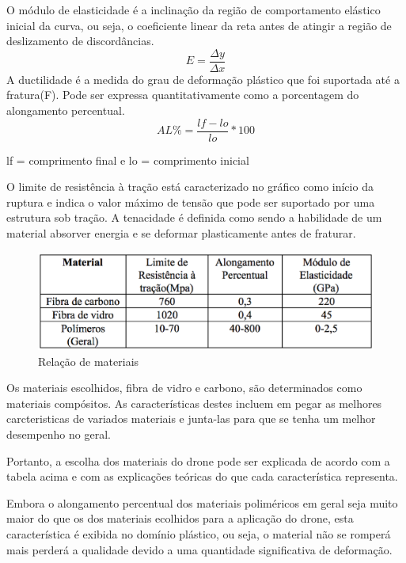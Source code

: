 O módulo de elasticidade é a inclinação da região de comportamento elástico inicial da curva, ou seja, o coeficiente linear da reta antes de atingir a região de deslizamento de discordâncias.
\begin{equation}
E =\frac{\Delta y}{\Delta x}
\end{equation}
A ductilidade é a medida do grau de deformação plástico que foi suportada até a fratura(F). Pode ser expressa quantitativamente como a porcentagem do alongamento percentual.
\begin{equation}
AL\% =\frac{lf - lo}{lo} * 100
\end{equation}
\begin{center}
lf = comprimento final e lo = comprimento inicial
\end{center}

O limite de resistência à tração está caracterizado no gráfico como início da ruptura e indica o valor máximo de tensão que pode ser suportado por uma estrutura sob tração.
A tenacidade é definida como sendo a habilidade de um material absorver energia e se deformar plasticamente antes de fraturar.

\begin{figure}[h]
    \centering
      \includegraphics[keepaspectratio=true,scale=0.5]{figuras/graficoRelacao.eps}
    \caption{ Relação de materiais}
    \label{fig:graficoRelacao}
\end{figure}

Os materiais escolhidos, fibra de vidro e carbono, são determinados como materiais compósitos. As características destes incluem em pegar as melhores carcteristicas de variados materiais e junta-las para que se tenha um melhor desempenho no geral. 

Portanto, a escolha dos materiais do drone pode ser explicada de acordo com a tabela acima e com as explicações teóricas do que cada característica representa. 

Embora o alongamento percentual dos materiais poliméricos em geral seja muito maior do que os dos materiais ecolhidos para a aplicação do drone, esta característica é exibida no domínio plástico, ou seja, o material não se romperá mais perderá a qualidade devido a uma quantidade significativa de deformação.

